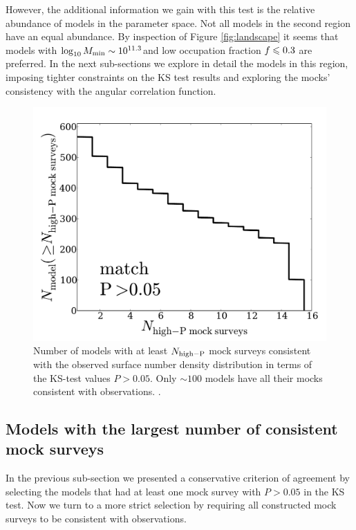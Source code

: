 \documentclass[usenatbib]{mn2e}
\newcommand{\hMsun}{{\ifmmode{h^{-1}{\rm
        {M_{\odot}}}}\else{$h^{-1}{\rm{M_{\odot}}}$}\fi}}
\begin{document}
However, the additional information we gain with this test is the
relative abundance of models in the parameter space. Not all 
models in the second region have an equal abundance. By inspection of
Figure \ref{fig:landscape} it seems that models with $\log_{10}M_{\rm
  min}\sim 10^{11.3}$\hMsun and low occupation fraction $f_{\rm}\leq 0.3$
are preferred.  In the next sub-sections we explore in detail the
models in this region, imposing tighter constraints on the KS test
results and exploring the mocks' consistency with the angular correlation
function.  

\begin{figure}
\begin{center}
\includegraphics[width=0.95\linewidth,angle=0]{Fig4_match_P5.pdf}
\end{center} 
\caption{ Number of models with at least $N_{\rm high-P}$ mock surveys
  consistent with the observed surface number density
  distribution in terms of the KS-test values $P>0.05$. Only $\sim
  100$ models have all their mocks consistent with observations. 
  \label{fig:high_success_rate}.}  
\end{figure}
 
\subsection{Models with the largest number of consistent mock surveys}

In the previous sub-section we presented a conservative criterion of
agreement by selecting the models that had at least one mock survey
with $P>0.05$ in the KS test. Now we turn to a more strict selection
by requiring all constructed mock surveys to be consistent with
observations. 
\end{document}
